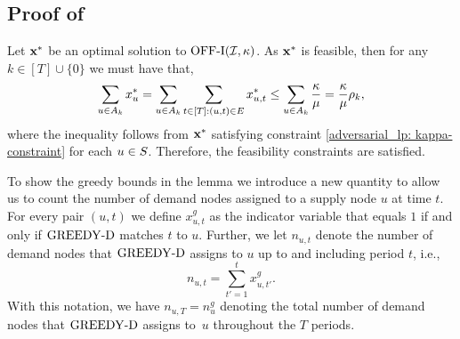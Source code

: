 \subsection{Proof of }
\label{ssec:AdvOfflineOptBound}
Let $\mathbf{x}^*$ be an optimal solution to $\mathrm{\mathrm{OFF}}\textrm{-}\mathrm{I}(\mathcal I,\kappa)$. As $\mathbf{x}^*$ is feasible, then for any $k \in [T] \cup \{0\}$ we must have that,
    \begin{equation*}
        \sum_{u \in A_k} x_u^* = \sum_{u \in A_k} \sum_{t \in [T]: (u,t) \in E} x_{u,t}^* \leq \sum_{u \in A_k} \frac{\kappa}{\mu} = \frac{\kappa}{\mu} \rho_k,\end{equation*}
    where the inequality follows from $\mathbf{x}^*$ satisfying constraint \eqref{adversarial_lp: kappa-constraint} {for each $u \in S$. Therefore, the feasibility constraints are satisfied.} 

    To show the {greedy bounds in} the lemma we introduce a new quantity to allow us to count the number of demand nodes assigned to a supply node $u$ at time $t$. For every pair $(u,t)$ we define $x_{u,t}^g$ as the indicator variable that equals $1$ if and only if $\mathrm{GREEDY\textrm{-}D}$ matches $t$ to $u$. Further, we let $n_{u,t}$ denote the number of demand nodes that $\mathrm{GREEDY\textrm{-}D}$ assigns to $u$ up to and including period $t$, i.e., %
    \begin{equation*}
        n_{u,t} = \sum_{t'=1}^t x_{u,{t'}}^g.
    \end{equation*}
With this notation, we have $n_{u, T}=n_u^g$ denoting the {total} number of demand nodes that $\mathrm{GREEDY\textrm{-}D}$ assigns to~$u$ {throughout the $T$ periods}.
    
